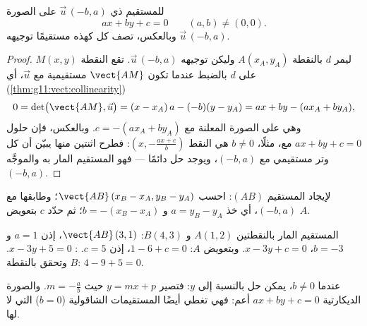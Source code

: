 \begin{theorem}\label{thm:g11:vect:cartesian}
للمستقيم ذي  $\vec u\,(-b, a)$  على
الصورة
\[
ax + by + c = 0
\qquad (a, b) \neq (0, 0).
\]
وبالعكس، تصف كل  كهذه مستقيمًا  توجيهه
$\vec u\,(-b, a)$.
\end{theorem}

\begin{proof}
ليمر $d$ بالنقطة $A(x_A, y_A)$ وليكن توجيهه $\vec u\,(-b, a)$. تقع
النقطة $M(x, y)$ على $d$ بالضبط عندما تكون $\vect{AM}$ مستقيمية مع
$\vec u$، أي (\cref{thm:g11:vect:collinearity})
\[
0 = \det\bigl(\vect{AM}, \vec u\bigr)
= (x - x_A)\,a - (-b)(y - y_A)
= ax + by - (a x_A + b y_A),
\]
وهي  على الصورة المعلنة مع $c = -(a x_A + b y_A)$.
وبالعكس، فإن حلول $ax + by + c = 0$ مع، مثلًا، $b \neq 0$ هي
النقط $\left(x, -\frac{a x + c}{b}\right)$: فطرح اثنتين منها
يبيّن أن كل وتر مستقيمي مع $(-b, a)$، ويوجد حل دائمًا
--- فهو المستقيم المار به والموجَّه  $(-b, a)$.
\end{proof}

\begin{method}\label{met:g11:vect:twopoints}
لإيجاد  المستقيم $(AB)$: احسب 
$\vect{AB}\,(x_B - x_A, y_B - y_A)$؛ وطابقها مع $(-b, a)$، أي خذ
$a = y_B - y_A$ و $b = -(x_B - x_A)$؛ ثم حدّد $c$ بتعويض
 $A$.
\end{method}

\begin{example}\label{ex:g11:vect:twopoints}
المستقيم المار بالنقطتين $A(1, 2)$ و $B(4, 3)$: $\vect{AB}\,(3, 1)$، إذن
$a = 1$ و $b = -3$،  $x - 3y + c = 0$. وبتعويض $A$:
$1 - 6 + c = 0$، إذن $c = 5$. : $x - 3y + 5 = 0$. وتحقق بالنقطة $B$:
$4 - 9 + 5 = 0$.
\end{example}

\begin{remark}
عندما $b \neq 0$، يمكن حل  بالنسبة إلى $y$: فتصير $y = mx + p$ حيث
 $m = -\frac ab$. والصورة الديكارتية $ax + by + c = 0$ أعم:
فهي تغطي أيضًا المستقيمات الشاقولية ($b = 0$) التي لا  لها.
\end{remark}

